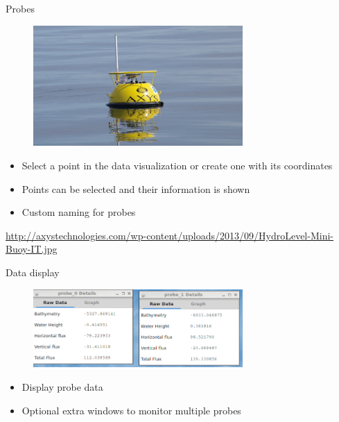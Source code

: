 \documentclass[shortpres,usenames,dvipsnames]{beamer}
\begin{document}
\begin{frame}[fragile]{Probes}
	\begin{figure}
		\includegraphics[clip, width=80mm]{img/Buoy.jpg}
	\end{figure}
	\begin{itemize}
		\item Select a point in the data visualization or create one with its coordinates
		\item Points can be selected and their information is shown
		\item Custom naming for probes
	\end{itemize}
	\vfill
	\flushleft
	{\fontsize{5}{5} \selectfont \url{http://axystechnologies.com/wp-content/uploads/2013/09/HydroLevel-Mini-Buoy-IT.jpg}}
\end{frame}

\begin{frame}[fragile]{Data display}
	\begin{figure}
		\includegraphics[clip, width=80mm]{img/datadisplay.png}
	\end{figure}
	\begin{itemize}
		\item Display probe data
		\item Optional extra windows to monitor multiple probes
	\end{itemize}
\end{frame}
\end{document}
